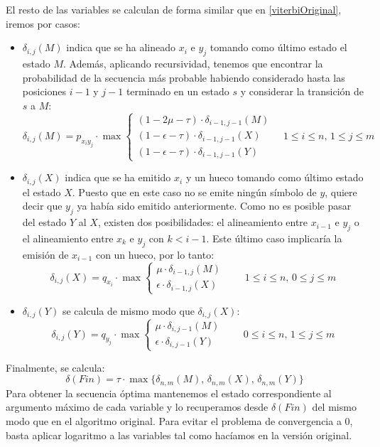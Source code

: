 El resto de las variables se calculan de forma similar que en \eqref{viterbiOriginal}, iremos por casos:
\begin{itemize}
    \item $\delta_{i,j}(M)$ indica que se ha alineado $x_i$ e $y_j$ tomando como último estado el estado $M$. Además, aplicando recursividad, tenemos que encontrar la probabilidad de la secuencia más probable habiendo considerado hasta las posiciones $i-1$ y $j-1$ terminado en un estado $s$ y considerar la transición de $s$ a $M$:
    \[\delta_{i,j}(M)=p_{x_iy_j}\cdot \max
    \begin{cases}
        (1-2\mu-\tau)\cdot\delta_{i-1,j-1}(M) \\
        (1-\epsilon-\tau)\cdot\delta_{i-1,j-1}(X) \\
        (1-\epsilon-\tau)\cdot\delta_{i-1,j-1}(Y)
    \end{cases} \quad 1\leq i\leq n, \, 1\leq j \leq m\] 

    \item $\delta_{i,j}(X)$ indica que se ha emitido $x_i$ y un hueco tomando como último estado el estado $X$. Puesto que en este caso no se emite ningún símbolo de $y$, quiere decir que $y_j$ ya había sido emitido anteriormente. Como no es posible pasar del estado $Y$ al $X$, existen dos posibilidades: el alineamiento entre $x_{i-1}$ e $y_j$ o el alineamiento entre $x_k$ e $y_j$ con $k<i-1$. Este último caso implicaría la emisión de $x_{i-1}$ con un hueco, por lo tanto:
    \[\delta_{i,j}(X)=q_{x_i}\cdot \max 
    \begin{cases}
        \mu\cdot\delta_{i-1,j}(M) \\
        \epsilon\cdot\delta_{i-1,j}(X) 
    \end{cases} \qquad 1\leq i\leq n, \, 0\leq j \leq m\]

    \item $\delta_{i,j}(Y)$ se calcula de mismo modo que $\delta_{i,j}(X)$:
    \[\delta_{i,j}(Y)=q_{y_j}\cdot \max 
    \begin{cases}
        \mu\cdot\delta_{i,j-1}(M) \\
        \epsilon\cdot\delta_{i,j-1}(Y) 
    \end{cases} \qquad 0\leq i\leq n, \, 1\leq j \leq m \]
\end{itemize}
Finalmente, se calcula:
\[\delta(Fin)=\tau\cdot\max\{\delta_{n,m}(M),\,\delta_{n,m}(X),\,\delta_{n,m}(Y)\}\]
Para obtener la secuencia óptima mantenemos el estado correspondiente al argumento máximo de cada variable y lo recuperamos desde $\delta(Fin)$ del mismo modo que en el algoritmo original. Para evitar el problema de convergencia a $0$, basta aplicar logaritmo a las variables tal como hacíamos en la versión original.

